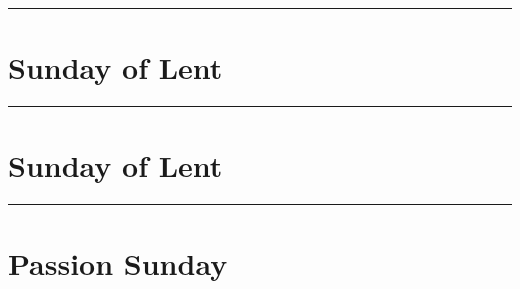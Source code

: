 {{{\def\commemorations{If today is March 18 or 19, \emph{First Vespers of St Joseph} is commemorated as follows.}
\printcommemnote{}
}

\bigskip
\hrule
\medskip
{
\label{stjoseph-commem}
\def\begincollectcols{\begin{parcolumns}[rulebetween,colwidths={1=0.42\linewidth}]{2}}
\def\vrlinebreak{T}

\bigskip
\benedicamusdomino{}
}

{
\section{ Sunday of Lent}
\label{lent3}
\printcommonvespers[1]
\def\postmagtitle{\label{lent3mag}}

\def\commemorations{If today is March 18 or 19, \emph{First Vespers of St Joseph} is commemorated as on page \pageref{stjoseph-commem}.  If today is March 24 or 25, \emph{First Vespers of the Annunciation} is commemorated as follows.}
\printcommemnote{}
}

\bigskip
\hrule
\medskip
{
\label{annunciation-commem}
\def\begincollectcols{\begin{parcolumns}[rulebetween,colwidths={1=0.43\linewidth}]{2}}


\bigskip

\benedicamusdominolentoreaster{}
}

\def\commemorations{If today is March 18 or 19, \emph{First Vespers of St Joseph} is commemorated as on page \pageref{stjoseph-commem}.  If today is March 24 or 25, \emph{First Vespers of the Annunciation} is commemorated as on page \pageref{annunciation-commem}.}
{
\section{ Sunday of Lent}
\label{lent4}
\def\liturgicalcolor{Violet or Rose}
\printcommonvespers[1]
\def\postmagtitle{\label{lent4mag}}

\printcommemnote{}
}

\medskip
\hrule
{
\let\printhymnnote=\undefined
\section{Passion Sunday}
\label{lent5}\label{passionsunday}
\printcommonvespers[1]
\def\hymnlabel{hymn-vexillaregis}
\def\prehymn{\needspace{8\baselineskip}\printnote{All kneel for the sixth verse of the following hymn.}}
\def\vrlabel{vr-eripeme}
\def\hymninput{\gabcfolder/inc-hymn-VexillaRegis}
\def\premagtitle{\vspace{-0.5\baselineskip}}
\def\premagnificat{%
%
\needspace{14\baselineskip}}

}}}
